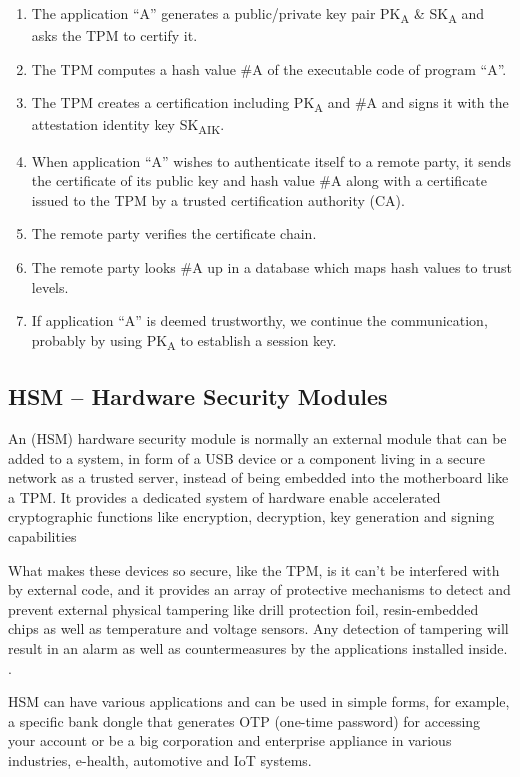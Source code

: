 \begin{enumerate}
	\item The application “A” generates a public/private key pair PK\textsubscript{A} \& SK\textsubscript{A} and asks the \gls{TPM} to certify it.
	\item The TPM computes a hash value \#A of the executable code of program “A”.
	\item The TPM creates a certification including PK\textsubscript{A} and \#A and signs it with the attestation identity key SK\textsubscript{AIK}.
	\item When application “A” wishes to authenticate itself to a remote party, it sends the certificate of its public key and hash value \#A along with a certificate issued to the TPM by a trusted certification authority (\gls{CA}).
	\item The remote party verifies the certificate chain.
	\item The remote party looks \#A up in a database which maps hash values to trust levels.
	\item If application “A” is deemed trustworthy, we continue the communication,
	probably by using PK\textsubscript{A} to establish a session key.
\end{enumerate}

\subsection{HSM – Hardware Security Modules} %
\label{ssec:hardware_security_modules}

An (\gls{HSM}) hardware security module is normally an external module that can be added to a system, in form of a \gls{USB} device or a component living in a secure network as a trusted server, instead of being embedded into the motherboard like a \gls{TPM}. It provides a dedicated system of hardware enable accelerated cryptographic functions like encryption, decryption, key generation and signing capabilities \cite{hsm:1}

What makes these devices so secure, like the \gls{TPM}, is it can't be interfered with by external code, and it provides an array of protective mechanisms to detect and prevent external physical tampering like drill protection foil, resin-embedded chips as well as temperature and voltage sensors. Any detection of tampering will result in an alarm as well as countermeasures by the applications installed inside. \cite{hsm:2}.

\gls{HSM} can have various applications and can be used in simple forms, for example, a specific bank dongle that generates \gls{OTP} (one-time password) for accessing your account or be a big corporation and enterprise appliance in various industries, e-health, automotive and \gls{IoT} systems.

